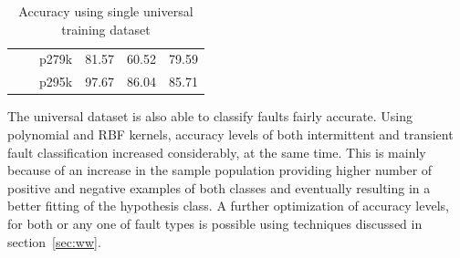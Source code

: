 \begin{table}[h]
{\begin{tabular}{cccccc}
                            &                                                 & p279k                    & 81.57            & 60.52         & 79.59                      \\
                            &                                                 & p295k                    & 97.67            & 86.04         & 85.71     \\
\hline                
\end{tabular}
}
\caption{Accuracy using single universal training dataset}
\label{tab:universal}
\end{table}

The universal dataset is also able to classify faults fairly accurate. Using polynomial and RBF kernels, accuracy levels of both intermittent and transient fault classification increased considerably, at the same time. This is mainly because of an increase in the sample population providing  higher number of positive and negative examples of both classes and eventually resulting in a better fitting of the hypothesis class. A further optimization of accuracy levels, for both or any one of fault types is possible using techniques discussed in section~\ref{sec:ww}.



